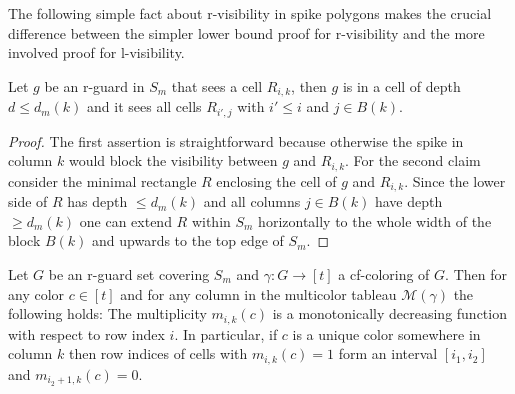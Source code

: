\documentclass[a4paper,USenglish,numberwithinsect]{lipics}
\theoremstyle{plain}
\begin{document}
The following simple fact  about r-visibility in spike polygons
makes  the crucial difference between
the simpler lower bound  proof for
r-visibility and the more involved proof for l-visibility.


\begin{lemma}
\label{rVis}
Let $g$ be an r-guard in $S_m$ that sees a cell $R_{i,k}$,
then $g$ is  in a cell of depth $d \leq d_m(k)$
and it sees all cells $R_{i',j}$ with
$i' \leq i$ and $j \in B(k)$.
\end{lemma}
\begin{proof}
The first assertion is straightforward because otherwise the spike in
column $k$ would block
the visibility between $g$ and $R_{i,k}$. For the second claim
consider the minimal rectangle $R$ enclosing the cell of $g$ and 
$R_{i,k}$. Since the lower
side of $R$ has depth  $\leq d_m(k)$ and all columns $j \in B(k)$ have
depth  $\geq d_m(k)$
one can extend $R$ within $S_m$ horizontally to the whole width of the
block $B(k)$
and upwards to the top edge of $S_m$.
\end{proof}

\begin{lemma}
\label{uniqueInterval}
Let $G$ be an r-guard set covering $S_m$ and  $\gamma : G \rightarrow [t]$
a cf-coloring of $G$. Then for any color $c \in [t]$ and for any column in
the multicolor tableau ${\mathcal M}(\gamma)$ the following holds: The
multiplicity $m_{i,k}(c)$
is a monotonically decreasing function with respect to  row index $i$.
In particular, if $c$ is a unique color somewhere in column $k$ then
row indices of cells
with $m_{i,k}(c)=1$ form an interval $[i_1,i_2]$ and  $m_{i_2+1,k}(c)=0$.
\end{lemma}
\end{document}
